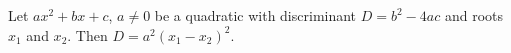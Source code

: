 \begin{frame}
\begin{proposition}
Let $ax^2+bx+c$, $a\neq 0$ be a quadratic with discriminant $D=b^2-4ac$ and roots $x_1$ and $x_2$. Then $D=a^2(x_1-x_2)^2$.
\end{proposition}

\end{frame}
